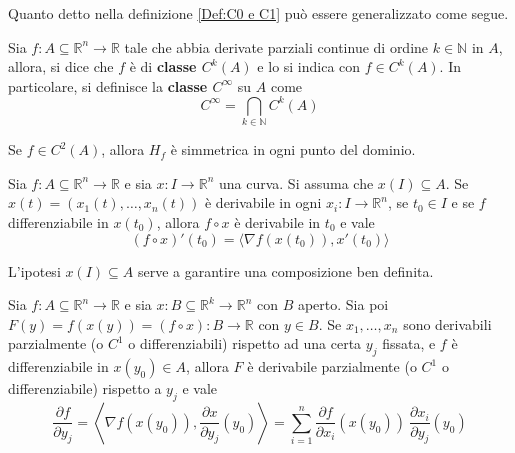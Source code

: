 Quanto detto nella definizione \ref{Def:C0 e C1} può essere generalizzato come segue.
\begin{definition} \label{Def: Ck}
    Sia $f:A \subseteq \mathbb{R}^n\to \mathbb{R}$ tale che abbia derivate parziali continue di ordine $k \in \mathbb{N}$ in $A$, allora, si dice che $f$ è di \textbf{classe $C^k(A)$} e lo si indica con $f \in C^k(A)$.
    In particolare, si definisce la \textbf{classe $C^\infty$} su $A$ come
    \begin{equation*}
      C^\infty= \bigcap_{k \in \mathbb{N}}{C^k(A)}
    \end{equation*}
\end{definition}
\begin{corollary}
    Se $f \in C^2(A)$, allora $H_f$ è simmetrica in ogni punto del dominio.
\end{corollary}
\begin{theorem} \label{Teo: Derivata composta 1}
    Sia $f:A \subseteq \mathbb{R}^n \to \mathbb{R}$ e sia $x: I \to \mathbb{R}^n$ una curva. Si assuma che $x(I) \subseteq A$. Se $x(t)=(x_1(t), \dots, x_n(t))$ è derivabile in ogni $x_i:I \to \mathbb{R}^n$, se $t_0 \in I$ e se $f$ differenziabile in $x(t_0)$, allora
    $f \circ x$ è derivabile in $t_0$ e vale
    \begin{equation}
        (f \circ x)'(t_0)= \langle \nabla f(x(t_0)), x'(t_0) \rangle \label{Eq: Derivata composta 1}
    \end{equation}
\end{theorem}
\begin{oss}
    L'ipotesi $x(I) \subseteq A$ serve a garantire una composizione ben definita.
\end{oss}
\begin{theorem} \label{Teo: Derivata composta 2}
    Sia $f:A \subseteq \mathbb{R}^n \to \mathbb{R}$ e sia $x: B \subseteq \mathbb{R}^k \to \mathbb{R}^n$ con $B$ aperto. Sia poi $F(y)=f(x(y))=(f \circ x): B \to \mathbb{R}$ con $y \in B$. Se $x_1, \dots, x_n$ sono derivabili parzialmente (o $C^1$ o differenziabili) rispetto ad una certa $y_j$ fissata, e $f$ è differenziabile in $x(y_0) \in A$, allora $F$ è derivabile parzialmente (o $C^1$ o differenziabile) rispetto a $y_j$ e vale 
    \begin{equation} \label{Eq: Derivata composta 2}
        \frac{\partial f}{\partial y_j}=\left\langle \nabla f(x(y_0)), \frac{\partial x}{\partial y_j}(y_0)\right\rangle=\sum\limits_{i=1}^{n}{\frac{\partial f}{\partial x_i}(x(y_0))\ \frac{\partial x_i}{\partial y_j}(y_0)}
    \end{equation}    
\end{theorem}
